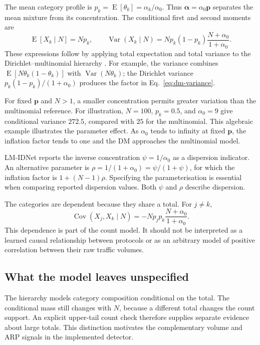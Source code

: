 The mean category profile is
$p_k=\operatorname{E}[\theta_k]=\alpha_k/\alpha_0$. Thus
$\boldsymbol{\alpha}=\alpha_0\boldsymbol{p}$ separates the mean mixture
from its concentration. The conditional first and second moments are
\begin{equation}
  \operatorname{E}[X_k\mid N]=Np_k,
  \qquad
  \operatorname{Var}(X_k\mid N)
    =Np_k(1-p_k)\frac{N+\alpha_0}{1+\alpha_0}.
\label{eq:dm-variance}
\end{equation}
These expressions follow by applying total expectation and total variance
to the Dirichlet--multinomial hierarchy
\cite{yu2014,alhajbaddar2025analysis}. For example, the variance combines
$\operatorname{E}[N\theta_k(1-\theta_k)]$ with
$\operatorname{Var}(N\theta_k)$; the Dirichlet variance
$p_k(1-p_k)/(1+\alpha_0)$ produces the factor in
Eq.~\eqref{eq:dm-variance}.

For fixed $\boldsymbol{p}$ and $N>1$, a smaller concentration permits
greater variation than the multinomial reference. For illustration,
$N=100$, $p_k=0.5$, and $\alpha_0=9$ give conditional variance $272.5$,
compared with $25$ for the multinomial. This algebraic example illustrates
the parameter effect. As $\alpha_0$ tends to
infinity at fixed $\boldsymbol{p}$, the inflation factor tends to one and
the DM approaches the multinomial model.

LM-IDNet reports the inverse concentration $\psi=1/\alpha_0$ as a
dispersion indicator. An alternative parameter is
$\rho=1/(1+\alpha_0)=\psi/(1+\psi)$, for which the inflation factor is
$1+(N-1)\rho$. Specifying the parameterisation is essential when comparing
reported dispersion values. Both $\psi$ and $\rho$ describe dispersion.

The categories are dependent because they share a total. For $j\ne k$,
\[
  \operatorname{Cov}(X_j,X_k\mid N)
  =-Np_jp_k\frac{N+\alpha_0}{1+\alpha_0}.
\]
This dependence is part of the count model. It should not be interpreted
as a learned causal relationship between protocols or as an arbitrary
model of positive correlation between their raw traffic volumes.

\subsection{What the model leaves unspecified}

The hierarchy models category composition conditional on the total. The
conditional mass still changes with $N$, because a different total changes
the count support. An explicit upper-tail count check therefore supplies
separate evidence about large totals. This distinction motivates the
complementary volume and ARP signals in the implemented detector.

